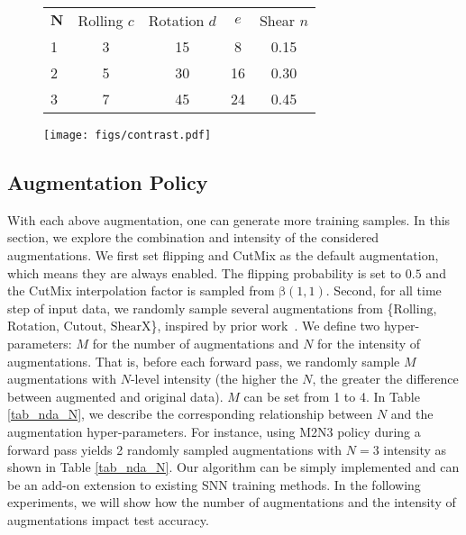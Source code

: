 \documentclass[runningheads]{llncs}
\newcommand{\bftab}{\fontseries{b}\selectfont}
\begin{document}
\begin{figure}[t]
\noindent\begin{minipage}{\textwidth}
\begin{minipage}{0.68\textwidth}
\centering
{}
\begin{tabular}{l  c  c  c  c}
    \toprule
{\bftab$\boldsymbol{N}$} & {\bftab Rolling} $c$ & {\bftab Rotation} $d$ & \bftab{Cutout} $e$ & {\bftab Shear} $n$ \\
\noalign{\smallskip}
\hline
\noalign{\smallskip}
1 & 3 & 15 & 8 & 0.15 \\
2 & 5 & 30 & 16 & 0.30 \\
3 & 7 & 45 & 24 & 0.45 \\
\bottomrule
\end{tabular}
\label{tab_nda_N}
\end{minipage}
\hfill
\begin{minipage}{0.31\textwidth}
\centering
\texttt{[image: figs/contrast.pdf]}
\label{fig_contrast_learning}
\end{minipage}
\end{minipage}
\end{figure}


\subsection{Augmentation Policy}
With each above augmentation, one can generate more training samples. 
In this section, we explore the combination and intensity of the considered augmentations.
We first set flipping and CutMix as the default augmentation, which means they are always enabled. The flipping probability is set to $0.5$ and the CutMix interpolation factor is sampled from $\mathrm{\beta}(1, 1)$. 
Second, for all time step of input data, we randomly sample several augmentations from \{$\mathrm{Rolling}$, $\mathrm{Rotation}$, $\mathrm{Cutout}$, $\mathrm{ShearX}$\}, inspired by prior work~\cite{cubuk2020randaugment,munoz2017deep,zhong2020random}. We define two hyper-parameters: $M$ for the number of augmentations and $N$ for the intensity of augmentations. That is, before each forward pass, we randomly sample $M$ augmentations with $N$-level intensity (the higher the $N$, the greater the difference between augmented and original data). $M$ can be set from 1 to 4. In Table \ref{tab_nda_N}, we describe the corresponding relationship between $N$ and the augmentation hyper-parameters. For instance, using M2N3 policy during a forward pass yields 2 randomly sampled augmentations with $N=3$ intensity as shown in Table \ref{tab_nda_N}. Our algorithm can be simply implemented and can be an add-on extension to existing SNN training methods. 
In the following experiments, we will show how the number of augmentations and the intensity of augmentations impact test accuracy.
\end{document}
